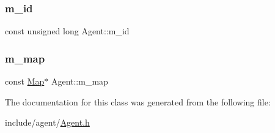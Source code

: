 \mbox{\label{class_agent_ad1f52e164c2a829ef4418940567d6e37}} 
\subsubsection{\texorpdfstring{m\+\_\+id}{m\_id}}
{\footnotesize\ttfamily const unsigned long Agent\+::m\+\_\+id\hspace{0.3cm}{\ttfamily [private]}}

\mbox{\label{class_agent_ab24d62bbfc22946d0c72221c8a43f04a}} 
\subsubsection{\texorpdfstring{m\+\_\+map}{m\_map}}
{\footnotesize\ttfamily const \hyperlink{class_map}{Map}$\ast$ Agent\+::m\+\_\+map\hspace{0.3cm}{\ttfamily [private]}}



The documentation for this class was generated from the following file\+:\begin{DoxyCompactItemize}
\item 
include/agent/\hyperlink{_agent_8h}{Agent.\+h}\end{DoxyCompactItemize}

